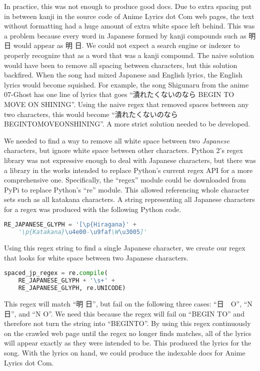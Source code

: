 \documentclass{acm} %
\begin{document}
\begin{CJK}{UTF8}{zhsong}
In practice, this was not enough to produce good docs. Due to extra spacing put in between kanji in the source code of Anime Lyrics dot Com web pages, the text without formatting had a huge amount of extra white space left behind. This was a problem because every word in Japanese formed by kanji compounds such as 明日 would appear as 明 日. We could not expect a search engine or indexer to properly recognize that as a word that was a kanji compound. The naive solution would have been to remove all spacing between characters, but this solution backfired. When the song had mixed Japanese and English lyrics, the English lyrics would become squished. For example, the song Shigunaru from the anime 07-Ghost has one line of lyrics that goes ``潰れたくないのなら BEGIN TO MOVE ON SHINING''. Using the naive regex that removed spaces between any two characters, this would become ``潰れたくないのならBEGINTOMOVEONSHINING''. A more strict solution needed to be developed.

We needed to find a way to remove all white space between two \emph{Japanese} characters, but ignore white space between other characters. Python 2's regex library was not expressive enough to deal with Japanese characters, but there was a library in the works intended to replace Python's current regex API for a more comprehensive one. Specifically, the ``regex'' module could be downloaded from PyPi to replace Python's ``re'' module. This allowed referencing whole character sets such as all katakana characters. A string representing all Japanese characters for a regex was produced with the following Python code.

\begin{lstlisting}[language=Python]
RE_JAPANESE_GLYPH = '[\p{Hiragana}' +
    '\p{Katakana}\u4e00-\u9faf\W\u3005]'
\end{lstlisting}

Using this regex string to find a single Japanese character, we create our regex that looks for white space between two Japanese characters.

\begin{lstlisting}[language=Python]
spaced_jp_regex = re.compile(
    RE_JAPANESE_GLYPH + '\s+' +
    RE_JAPANESE_GLYPH, re.UNICODE)
\end{lstlisting}

This regex will match ``明 日'', but fail on the following three cases: ``日　O'', ``N 日'', and ``N O''. We need this because the regex will fail on ``BEGIN TO'' and therefore not turn the string into ``BEGINTO''. By using this regex continuously on the crawled web page until the regex no longer finds matches, all of the lyrics will appear exactly as they were intended to be. This produced the lyrics for the song. With the lyrics on hand, we could produce the indexable docs for Anime Lyrics dot Com.


\end{CJK}
\end{document}
